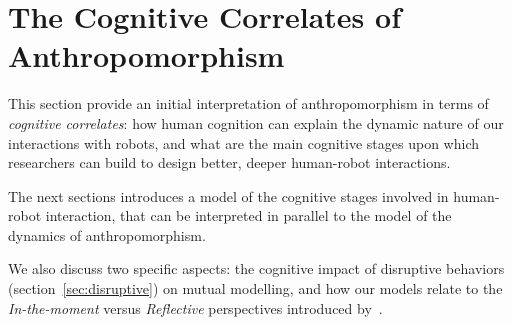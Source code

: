 \documentclass{frontiersSCNS} %
\begin{document}
%
%
%
%
%
%

\section{The Cognitive Correlates of Anthropomorphism}
\label{sec:cognition-neuroscience}

This section provide an initial interpretation of anthropomorphism in
terms of \emph{cognitive correlates}: how human cognition can explain the
dynamic nature of our interactions with robots, and what are the main cognitive
stages upon which researchers can build to design better, deeper human-robot
interactions.

The next sections introduces a model of the cognitive stages involved in
human-robot interaction, that can be interpreted in parallel to the model of the
dynamics of anthropomorphism.

We also discuss two specific aspects: the cognitive impact of disruptive
behaviors (section~\ref{sec:disruptive}) on mutual modelling, and how our models
relate to the \emph{In-the-moment} versus \emph{Reflective} perspectives
introduced by~\citet{takayama_perspectives_2012}.

%


\end{document}
